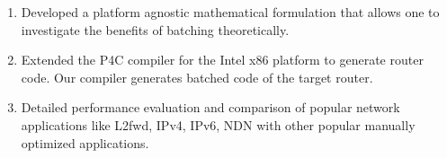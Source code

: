 \begin{enumerate}
\item Developed a platform agnostic mathematical formulation that allows one to investigate the benefits of batching theoretically. 
\item Extended the P4C compiler for the Intel x86 platform to generate router code. Our compiler generates batched code of the target router.
\item Detailed performance evaluation and comparison of popular network applications like L2fwd, IPv4, IPv6, NDN with other popular manually optimized applications. 
\end{enumerate}
